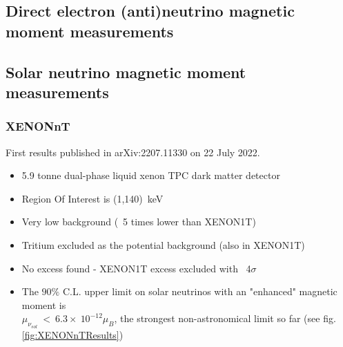\subsection{Direct electron (anti)neutrino magnetic moment measurements}

\subsection{Solar neutrino magnetic moment measurements}
\subsubsection{XENONnT}
First results published in arXiv:2207.11330\cite{XENON:2022mpc} on 22 July 2022.
\begin{itemize}
    \item 5.9 tonne dual-phase liquid xenon TPC dark matter detector
    \item Region Of Interest is (1,140)~keV
    \item Very low background (~5 times lower than XENON1T)
    \item Tritium excluded as the potential background (also in XENON1T)
    \item No excess found - XENON1T excess excluded with ~4$\sigma$
    \item The $90\%$ C.L. upper limit on solar neutrinos with an "enhanced" magnetic moment is \\$\mu_{\nu_{sol}}~<~6.3\times~10^{-12}\mu_B$, the strongest non-astronomical limit so far (see fig.\ref{fig:XENONnTResults})
\end{itemize}

